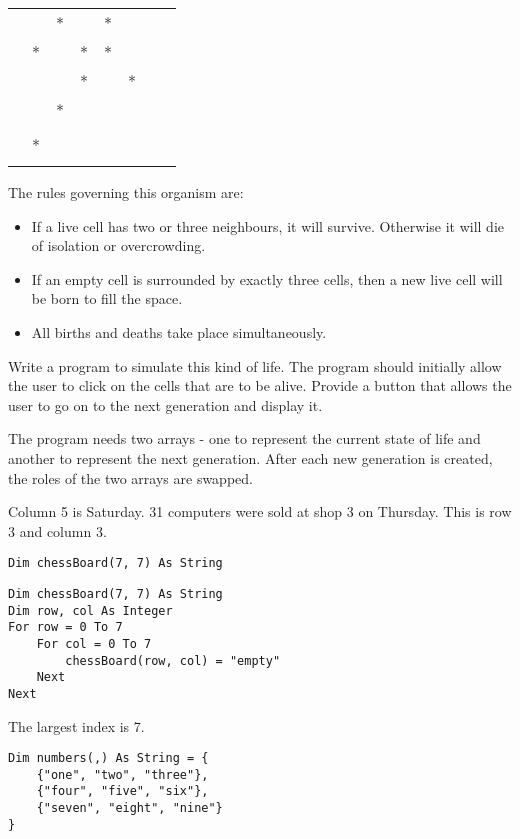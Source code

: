 \begin{EXE}
		\begin{center}
					\begin{tabular}{|c|c|c|c|c|c|c|c|}
						\hline
						& 	& 	& 	& 	&  	& 	&  \\ \hline
						& 	& *	& 	& *	&  	& 	&  \\ \hline
						& *	& 	& *	& *	&  	& 	&  \\ \hline
						& 	& 	& *	& 	& * & 	& \\ \hline
						& 	& *	& 	& 	&  	& 	&  \\ \hline
						& 	&   & 	& 	&  	& 	&  \\ \hline
						& *	& 	& 	& 	&  	& 	&  \\ \hline
						& 	& 	& 	& 	&  	& 	&  \\ \hline
					\end{tabular}
				\end{center}
				The rules governing this organism are:
				\begin{itemize}
     			\item If a live cell has two or three neighbours, it will survive. Otherwise it will die of isolation or overcrowding.
		      \item If an empty cell is surrounded by exactly three cells, then a new live cell will be born to fill the space.
     			\item All births and deaths take place simultaneously.
				\end{itemize}
				Write a program to simulate this kind of life. The program should initially allow the user to click on the cells that are to be alive. Provide a button that allows the user to go on to the next generation and display it.
					
				The program needs two arrays - one to represent the current state of life and another to represent the next generation. After each new generation is created, the roles of the two arrays are swapped.
		\end{EXE}


		\begin{stab}
			\begin{enumChapter}
				\item	Column 5 is Saturday. 31 computers were sold at shop 3 on Thursday. This is row 3 and column 3.
				\item
					\begin{lstlisting}
Dim chessBoard(7, 7) As String
					\end{lstlisting}
				\item	
					\begin{lstlisting}
Dim chessBoard(7, 7) As String
Dim row, col As Integer
For row = 0 To 7
	For col = 0 To 7
		chessBoard(row, col) = "empty"
	Next
Next
					\end{lstlisting}
				\item	The largest index is 7.
				\item
					\begin{lstlisting}
Dim numbers(,) As String = { 
	{"one", "two", "three"},
	{"four", "five", "six"},	
	{"seven", "eight", "nine"}
}
					\end{lstlisting}
			\end{enumChapter}
		\end{stab}
